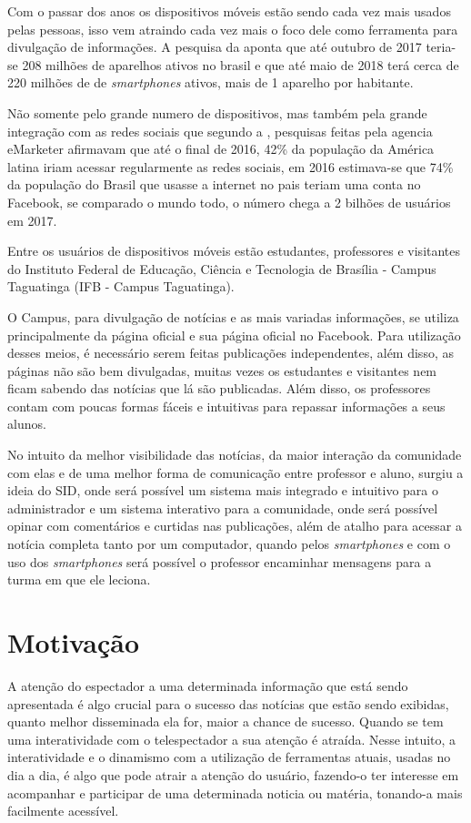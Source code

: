 Com o passar dos anos os dispositivos móveis estão sendo cada vez mais usados pelas pessoas, isso vem atraindo cada vez mais o foco dele como ferramenta para divulgação de informações. A pesquisa da \cite{fgv2017} aponta que até outubro de 2017 teria-se 208 milhões de aparelhos ativos no brasil e que até maio de 2018 terá cerca de 220 milhões de de \textit{smartphones} ativos, mais de 1 aparelho por habitante. 

Não somente pelo grande numero de dispositivos, mas também pela grande integração com as redes sociais que segundo a \cite{forbes2016}, pesquisas feitas pela agencia eMarketer afirmavam que até o final de 2016, 42\% da população da América latina iriam acessar regularmente as redes sociais, em 2016 estimava-se que 74\% da população do Brasil que usasse a internet no pais teriam uma conta no Facebook, se comparado o mundo todo, o número chega a 2 bilhões de usuários em 2017. 

Entre os usuários de dispositivos móveis estão estudantes, professores e visitantes do Instituto Federal de Educação, Ciência e Tecnologia de Brasília - Campus Taguatinga (IFB - Campus Taguatinga). 

O Campus, para divulgação de notícias e as mais variadas informações, se utiliza principalmente da página oficial e sua página oficial no Facebook. Para utilização desses meios, é necessário serem feitas publicações independentes, além disso, as páginas não são bem divulgadas, muitas vezes os estudantes e visitantes nem ficam sabendo das notícias que lá são publicadas. Além disso, os professores contam com poucas formas fáceis e intuitivas para repassar informações a seus alunos.

No intuito da melhor visibilidade das notícias, da maior interação da comunidade com elas e de uma melhor forma de comunicação entre professor e aluno, surgiu a ideia do SID, onde será possível um sistema mais integrado e intuitivo para o administrador e um sistema interativo para a comunidade, onde será possível opinar com comentários e curtidas nas publicações, além de atalho para acessar a notícia completa tanto por um computador, quando pelos \textit{smartphones} e com o uso dos \textit{smartphones} será possível o professor encaminhar mensagens para a turma em que ele leciona. 

\section{Motivação}
A atenção do espectador a uma determinada informação que está sendo apresentada é algo crucial para o sucesso das notícias que estão sendo exibidas, quanto melhor disseminada ela for, maior a chance de sucesso. Quando se tem uma interatividade com o telespectador a sua atenção é atraída. Nesse intuito, a interatividade e o dinamismo com a utilização de ferramentas atuais, usadas no dia a dia, é algo que pode atrair a atenção do usuário, fazendo-o ter interesse em acompanhar e participar de uma determinada noticia ou matéria, tonando-a mais facilmente acessível. 

